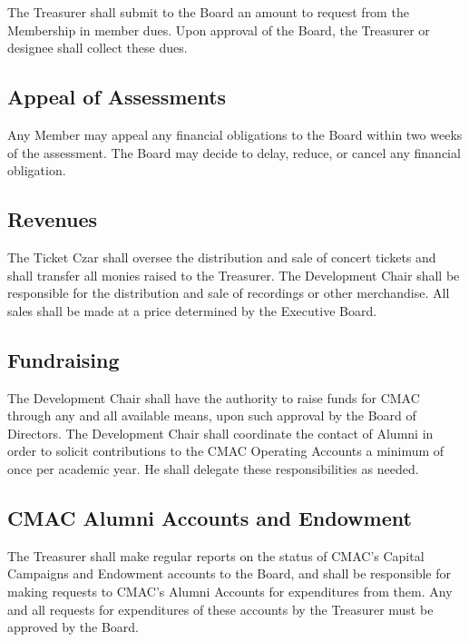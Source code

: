 \documentclass{article}
\begin{document}
The Treasurer shall submit to the Board an amount to request from
the Membership in member dues. Upon approval of the Board, the Treasurer
or designee shall collect these dues.

\subsection{Appeal of Assessments}

Any Member may appeal any financial obligations to the Board within
two weeks of the assessment. The Board may decide to delay, reduce,
or cancel any financial obligation.

\subsection{Revenues}

The Ticket Czar shall oversee the distribution and sale of concert
tickets and shall transfer all monies raised to the Treasurer. The
Development Chair shall be responsible for the distribution and sale
of recordings or other merchandise. All sales shall be made at a price
determined by the Executive Board.

\subsection{Fundraising}

The Development Chair shall have the authority to raise funds for
CMAC through any and all available means, upon such approval by the
Board of Directors. The Development Chair shall coordinate the contact
of Alumni in order to solicit contributions to the CMAC Operating
Accounts a minimum of once per academic year. He shall delegate these
responsibilities as needed.

\subsection{CMAC Alumni Accounts and Endowment}

The Treasurer shall make regular reports on the status of CMAC's Capital
Campaigns and Endowment accounts to the Board, and shall be responsible
for making requests to CMAC's Alumni Accounts for expenditures from
them. Any and all requests for expenditures of these accounts by the
Treasurer must be approved by the Board.

\end{document}
